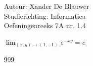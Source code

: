 \documentclass[a4paper]{article}
\begin{document}
\noindent \large Auteur: Xander De Blauwer \\
\noindent \large Studierichting: Informatica\\
\noindent \large Oefeningenreeks 7A nr. 1.4\\

\medskip

\normalsize

$\displaystyle \lim_{(x,y)\to(1,-1)} e^{-xy} = e$ \\


\begin{thebibliography}{999}
\end{thebibliography}
\end{document}
